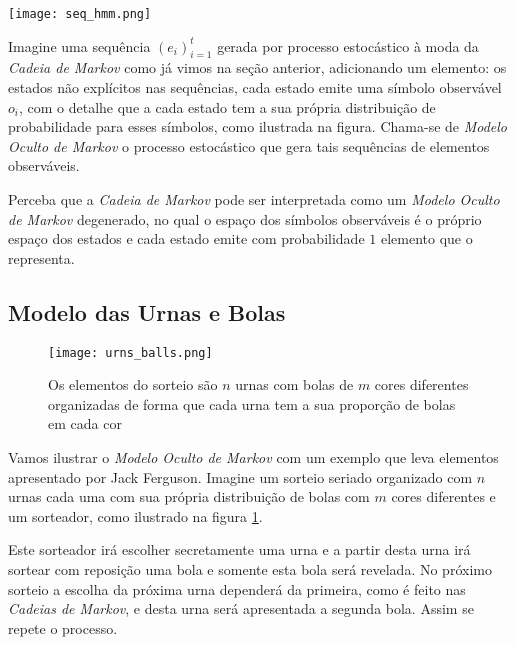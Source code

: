 \documentclass{subfiles}
\begin{document}
\begin{figure*}
    \centering
    \texttt{[image: seq\_hmm.png]}
    \caption{Na visualização sequencial de um \textit{Modelo Oculto de Markov}, o primeiro estado oculto é sorteado com a probabilidade presente na i-ésima coluna do vetor $\Pi_0$. Em seguida é sorteado o primeiro símbolo observável com probabilidade da coluna $j$ que corresponde o estado sorteado $h_1$ e linha $i$ correspondente ao símbolo observável $o_1$ na matriz $O$. O próximo estado é selecionado com probabilidade com a linha $i$ correspondente à $h_1$ e coluna $j=h_2$. O padrão se repete até um período $t$}
    \label{fig:seq_hmm}
\end{figure*}

Imagine uma sequência $(e_i)_{i=1}^t$ gerada por processo estocástico à moda da \textit{Cadeia de Markov} como já vimos na seção anterior, adicionando um elemento: os estados não explícitos nas sequências, cada estado emite uma símbolo observável $o_i$, com o detalhe que a cada estado tem a sua própria distribuição de probabilidade para esses símbolos, como ilustrada na figura. Chama-se de \textit{Modelo Oculto de Markov} o processo estocástico que gera tais sequências de elementos observáveis.

Perceba que a \textit{Cadeia de Markov} pode ser interpretada como um \textit{Modelo Oculto de Markov} degenerado, no qual o espaço dos símbolos observáveis é o próprio espaço dos estados e cada estado emite com probabilidade $1$ elemento que o representa.

\subsection{Modelo das Urnas e Bolas}

\begin{figure}
    \texttt{[image: urns\_balls.png]}
    \caption{Os elementos do sorteio são $n$ urnas com bolas de $m$ cores diferentes organizadas de forma que cada urna tem a sua proporção de bolas em cada cor}
    \label{fig:urn_ball}
\end{figure}

Vamos ilustrar o \textit{Modelo Oculto de Markov} com um exemplo que leva elementos apresentado por Jack Ferguson. Imagine um sorteio seriado organizado com $n$ urnas cada uma com sua própria distribuição de bolas com $m$ cores diferentes e um sorteador, como ilustrado na figura \ref{fig:urn_ball}.

Este sorteador irá escolher secretamente uma urna e a partir desta urna irá sortear com reposição uma bola e somente esta bola será revelada. No próximo sorteio a escolha da próxima urna dependerá da primeira, como é feito nas \textit{Cadeias de Markov}, e desta urna será apresentada a segunda bola. Assim se repete o processo.
\end{document}
